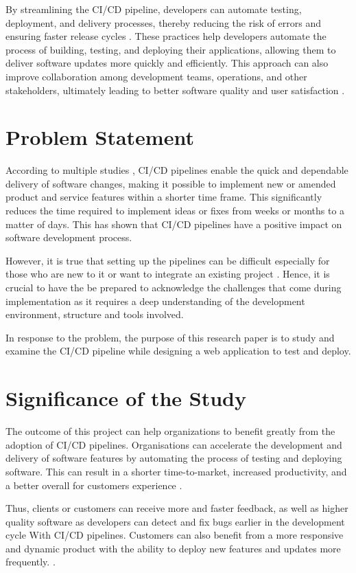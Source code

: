 By streamlining the CI/CD pipeline, developers can automate testing, deployment, and delivery processes, thereby reducing the risk of errors and ensuring faster release cycles \cite{kubinyi}. These practices help developers automate the process of building, testing, and deploying their applications, allowing them to deliver software updates more quickly and efficiently. This approach can also improve collaboration among development teams, operations, and other stakeholders, ultimately leading to better software quality and user satisfaction \cite{bs}.

\section{Problem Statement}
According to multiple studies \cite{sb, saz, chen, dm, saarenpaa2020creating}, CI/CD pipelines enable the quick and dependable delivery of software changes, making it possible to implement new or amended product and service features within a shorter time frame. This significantly reduces the time required to implement ideas or fixes from weeks or months to a matter of days. This has shown that CI/CD pipelines have a positive impact on software development process.

However, it is true that setting up the pipelines can be difficult especially for those who are new to it or want to integrate an existing project \cite{sander}. Hence, it is crucial to have the be prepared to acknowledge the challenges that come during implementation as it requires a deep understanding of the development environment, structure and tools involved.

In response to the problem, the purpose of this research paper is to study and examine the CI/CD pipeline while designing a web application to test and deploy.

\section{Significance of the Study}
The outcome of this project can help organizations to benefit greatly from the adoption of CI/CD pipelines. Organisations can accelerate the development and delivery of software features by automating the process of testing and deploying software. This can result in a shorter time-to-market, increased productivity, and a better overall for customers experience \cite{hf}.

Thus, clients or customers can receive more and faster feedback, as well as higher quality software as developers can detect and fix bugs earlier in the development cycle With CI/CD pipelines. Customers can also benefit from a more responsive and dynamic product with the ability to deploy new features and updates more frequently. \cite{chen, leppanenetal}.

